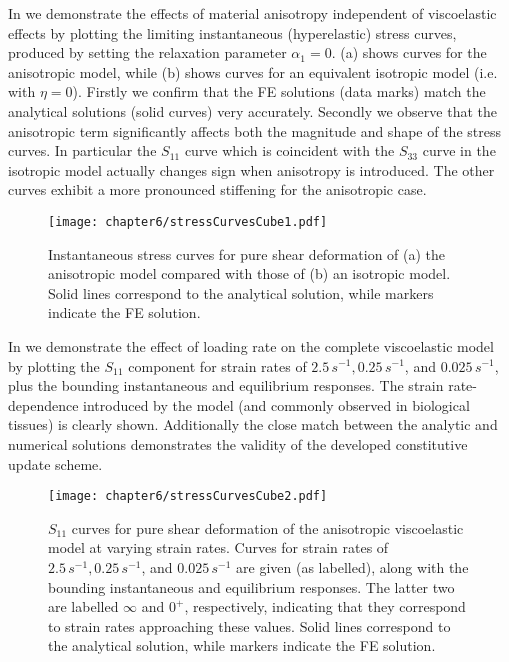 In  we demonstrate the effects of material anisotropy independent of viscoelastic effects by plotting the limiting instantaneous (hyperelastic) stress curves, produced by setting the relaxation parameter $\alpha_1 = 0$. (a) shows curves for the anisotropic model, while (b) shows curves for an equivalent isotropic model (i.e. with $\eta = 0$). Firstly we confirm that the FE solutions (data marks) match the analytical solutions (solid curves) very accurately. Secondly we observe that the anisotropic term significantly affects both the magnitude and shape of the stress curves. In particular the $S_{11}$ curve which is coincident with the $S_{33}$ curve in the isotropic model actually changes sign when anisotropy is introduced. The other curves exhibit a more pronounced stiffening for the anisotropic case. 
%
\begin{figure}[ht]
\begin{center}
\texttt{[image: chapter6/stressCurvesCube1.pdf]}
\end{center}
\caption[Stress comparison with analytical solution for a pure shear of a cube]{Instantaneous stress curves for pure shear deformation of (a) the anisotropic model compared with those of (b) an isotropic model. Solid lines correspond to the analytical solution, while markers indicate the FE solution.}
\label{chap6:fig-stressCurvesCube1}
\end{figure}

In  we demonstrate the effect of loading rate on the complete viscoelastic model by plotting the $S_{11}$ component for strain rates of $2.5\,s^{-1}, 0.25\,s^{-1}$, and $0.025\,s^{-1}$, plus the bounding instantaneous and equilibrium responses. The strain rate-dependence introduced by the model (and commonly observed in biological tissues) is clearly shown. Additionally the close match between the analytic and numerical solutions demonstrates the validity of the developed constitutive update scheme.
%
\begin{figure}[ht]
\begin{center}
\texttt{[image: chapter6/stressCurvesCube2.pdf]}
\end{center}
\caption[Stress comparison with analytical solution for a pure shear of a cube at various strain rate]{$S_{11}$ curves for pure shear deformation of the anisotropic viscoelastic model at varying strain rates. Curves for strain rates of $2.5\,s^{-1}, 0.25\,s^{-1}$, and $0.025\,s^{-1}$ are given (as labelled), along with the bounding instantaneous and equilibrium responses. The latter two are labelled $ \infty $ and $0^+$, respectively, indicating that they correspond to strain rates approaching these values. Solid lines correspond to the analytical solution, while markers indicate the FE solution.}
\label{chap6:fig-stressCurvesCube2}
\end{figure}


